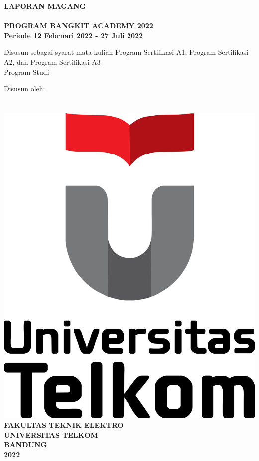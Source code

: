 \begin{titlepage}
	\begin{center}
	\thispagestyle{empty}
	\textbf{LAPORAN MAGANG}\\
	\bigskip
	\textbf{\JUDUL}\\
	\textbf{PROGRAM BANGKIT ACADEMY 2022}\\
	\bigskip
	\textbf{Periode 12 Februari 2022 - 27 Juli 2022}
	\bigskip
	
	\normalsize
	Disusun sebagai syarat mata kuliah Program Sertifikasi A1, Program Sertifikasi A2, dan Program Sertifikasi A3\\
	Program Studi \prodi
	
	\bigskip
	Disusun oleh:\\
	\textbf{\PENULIS}\\
	\textbf{\nim}\\
	\bigskip
	\bigskip
	\bigskip
	\includegraphics[scale=0.33]{./assets/logotelu.png}
	\vfill
	\Large
	\textbf{FAKULTAS TEKNIK ELEKTRO}\\
	\large
	\textbf{UNIVERSITAS TELKOM}\\
	\textbf{BANDUNG}\\
	\textbf{2022}
	\end{center} %
\end{titlepage}

